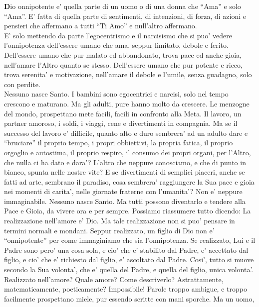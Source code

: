 \textbf{D}io onnipotente e' quella parte di un uomo o di una donna che ``Ama'' e solo ``Ama''.
E' fatta di quella parte di sentimenti, di intenzioni, di forza, di azioni e pensieri che affermano a tutti ``Ti Amo'' e null'altro affermano.\\
E' solo mettendo da parte l'egocentrismo e il narcisismo che si puo' vedere l'onnipotenza dell'essere umano che ama, seppur limitato, debole e ferito.  Dell'essere umano che pur malato ed abbandonato, trova pace ed anche gioia, nell'amare l'Altro quanto se stesso.  Dell'essere umano che pur potente e ricco, trova serenita' e motivazione, nell'amare il debole e l'umile, senza guadagno, solo con perdite.\\
\leavevmode
Nessuno nasce Santo. I bambini sono egocentrici e narcisi,
solo nel tempo crescono e maturano.
Ma gli adulti, pure hanno molto da crescere. Le menzogne del
mondo, prospettano mete facili, facili in confronto alla Meta.
Il lavoro, un partner amoroso, i soldi, i viaggi,
cene e divertimenti in compagnia. 
Ma se il successo del lavoro e' difficile,
quanto alto e duro sembrera' ad un adulto dare e ``bruciare''
il proprio tempo, i propri obbiettivi, la propria fatica,
il proprio orgoglio e autostima, il proprio respiro,
il consumo dei propri organi, per l'Altro, che nulla ci ha dato
e dara'? L'altro che neppure conosciamo, e che di punto in bianco,
spunta nelle nostre vite?
E se divertimenti di semplici piaceri, anche se fatti ad arte,
sembrano il paradiso, cosa sembrera' raggiungere la Sua pace e 
gioia nei momenti di carita', nelle giornate fraterne con l'umanita'?
Non e' neppure immaginabile.
Nessuno nasce Santo. Ma tutti possono diventarlo e tendere alla
Pace e Gioia, da vivere ora e per sempre.
\leavevmode
Possiamo riassumere tutto dicendo:
La realizzazione nell'amore e' Dio. Ma tale realizzazione non si puo'
pensare in termini normali e mondani.
Seppur realizzato, un figlio di Dio non e' ``onnipotente'' per come
immaginiamo che sia l'onnipotenza.
Se realizzato, Lui e il Padre sono pero' una cosa sola, 
e cio' che e' stabilito dal Padre, e' accettato dal figlio,
e cio' che e' richiesto dal figlio, e' ascoltato dal Padre.
Cosi', tutto si muove secondo la Sua volonta', che e' quella del Padre,
e quella del figlio, unica volonta'.
\leavevmode
Realizzato nell'amore? Quale amore?
Come descriverlo?
Astrattamente, matematicamente, poeticamente?
Impossibile! Parole troppo ambigue, 
e troppo facilmente prospettano miele,
pur essendo scritte con mani sporche.
Ma un uomo, 
